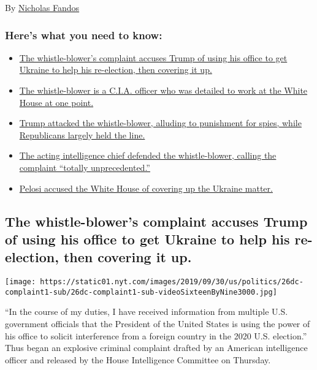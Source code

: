 By \href{https://www.nytimes.com/by/nicholas-fandos}{Nicholas Fandos}

\hypertarget{heres-what-you-need-to-know}{%
\subsubsection{Here's what you need to
know:}\label{heres-what-you-need-to-know}}

\begin{itemize}
\tightlist
\item
  \protect\hyperlink{link-e368d76}{The whistle-blower's complaint
  accuses Trump of using his office to get Ukraine to help his
  re-election, then covering it up.}
\item
  \protect\hyperlink{link-27535a8d}{The whistle-blower is a C.I.A.
  officer who was detailed to work at the White House at one point.}
\item
  \protect\hyperlink{link-1b122281}{Trump attacked the whistle-blower,
  alluding to punishment for spies, while Republicans largely held the
  line.}
\item
  \protect\hyperlink{link-12b58971}{The acting intelligence chief
  defended the whistle-blower, calling the complaint ``totally
  unprecedented.''}
\item
  \protect\hyperlink{link-1d7bb150}{Pelosi accused the White House of
  covering up the Ukraine matter.}
\end{itemize}

\hypertarget{the-whistle-blowers-complaint-accuses-trump-of-using-his-office-to-get-ukraine-to-help-his-re-election-then-covering-it-up}{%
\subsection{The whistle-blower's complaint accuses Trump of using his
office to get Ukraine to help his re-election, then covering it
up.}\label{the-whistle-blowers-complaint-accuses-trump-of-using-his-office-to-get-ukraine-to-help-his-re-election-then-covering-it-up}}

\texttt{[image: https://static01.nyt.com/images/2019/09/30/us/politics/26dc-complaint1-sub/26dc-complaint1-sub-videoSixteenByNine3000.jpg]}

``In the course of my duties, I have received information from multiple
U.S. government officials that the President of the United States is
using the power of his office to solicit interference from a foreign
country in the 2020 U.S. election.'' Thus began an explosive criminal
complaint drafted by an American intelligence officer and released by
the House Intelligence Committee on Thursday.


